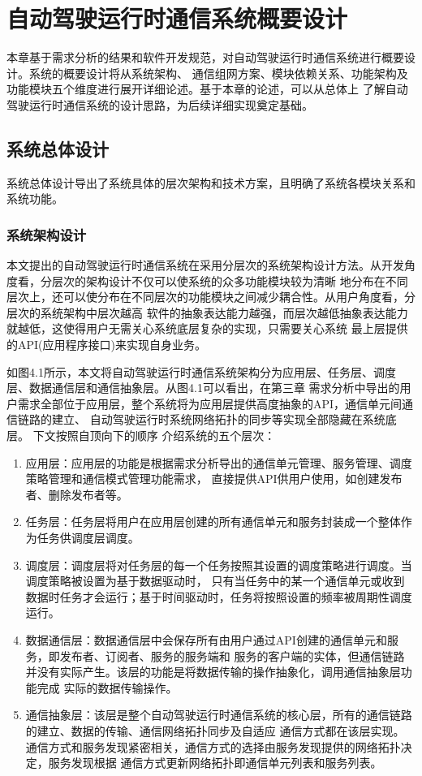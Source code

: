 \chapter{自动驾驶运行时通信系统概要设计}
本章基于需求分析的结果和软件开发规范，对自动驾驶运行时通信系统进行概要设计。系统的概要设计将从系统架构、
通信组网方案、模块依赖关系、功能架构及功能模块五个维度进行展开详细论述。基于本章的论述，可以从总体上
了解自动驾驶运行时通信系统的设计思路，为后续详细实现奠定基础。

\section{系统总体设计}
系统总体设计导出了系统具体的层次架构和技术方案，且明确了系统各模块关系和系统功能。
\subsection{系统架构设计}
本文提出的自动驾驶运行时通信系统在采用分层次的系统架构设计方法。从开发角度看，分层次的架构设计不仅可以使系统的众多功能模块较为清晰
地分布在不同层次上，还可以使分布在不同层次的功能模块之间减少耦合性。从用户角度看，分层次的系统架构中层次越高
软件的抽象表达能力越强，而层次越低抽象表达能力就越低，这使得用户无需关心系统底层复杂的实现，只需要关心系统
最上层提供的API(应用程序接口)来实现自身业务。

如图4.1所示，本文将自动驾驶运行时通信系统架构分为应用层、任务层、调度层、数据通信层和通信抽象层。从图4.1可以看出，在第三章
需求分析中导出的用户需求全部位于应用层，整个系统将为应用层提供高度抽象的API，通信单元间通信链路的建立、
自动驾驶运行时系统网络拓扑的同步等实现全部隐藏在系统底层。
下文按照自顶向下的顺序
介绍系统的五个层次：
\begin{enumerate}
    \item 应用层：应用层的功能是根据需求分析导出的通信单元管理、服务管理、调度策略管理和通信模式管理功能需求，
    直接提供API供用户使用，如创建发布者、删除发布者等。
    \item 任务层：任务层将用户在应用层创建的所有通信单元和服务封装成一个整体作为任务供调度层调度。
    \item 调度层：调度层将对任务层的每一个任务按照其设置的调度策略进行调度。当调度策略被设置为基于数据驱动时，
    只有当任务中的某一个通信单元或收到数据时任务才会运行；基于时间驱动时，任务将按照设置的频率被周期性调度运行。
    \item 数据通信层：数据通信层中会保存所有由用户通过API创建的通信单元和服务，即发布者、订阅者、服务的服务端和
    服务的客户端的实体，但通信链路并没有实际产生。该层的功能是将数据传输的操作抽象化，调用通信抽象层功能完成
    实际的数据传输操作。
    \item 通信抽象层：该层是整个自动驾驶运行时通信系统的核心层，所有的通信链路的建立、数据的传输、通信网络拓扑同步及自适应
    通信方式都在该层实现。通信方式和服务发现紧密相关，通信方式的选择由服务发现提供的网络拓扑决定，服务发现根据
    通信方式更新网络拓扑即通信单元列表和服务列表。
\end{enumerate}

